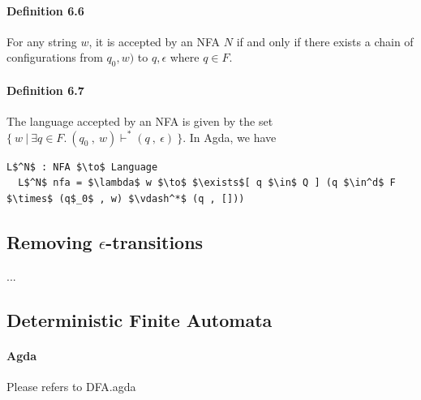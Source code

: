 \documentclass[twoside,openright,final]{bhamthesis}
\begin{document}
\paragraph{Definition 6.6} For any string \(w\), it is accepted by an NFA \(N\)
if and only if there exists a chain of configurations from \(q_0 ,
w)\) to \(q , \epsilon\) where \(q \in F\). 

\paragraph{Definition 6.7} The language accepted by an
NFA is given by the set \(\{\ w\ |\ \exists q\in F.\ (q_0\ ,\
w) \vdash^* (q\ ,\ \epsilon)\ \}\). In Agda, we have
\begin{lstlisting}[mathescape=true,aboveskip=0pt]
  L$^N$ : NFA $\to$ Language
  L$^N$ nfa = $\lambda$ w $\to$ $\exists$[ q $\in$ Q ] (q $\in^d$ F $\times$ (q$_0$ , w) $\vdash^*$ (q , []))
\end{lstlisting} 

\subsection{Removing \(\epsilon\)-transitions}
\par ...

\subsection{Deterministic Finite Automata}

\paragraph{Agda} Please refers to DFA.agda \\
\end{document}
